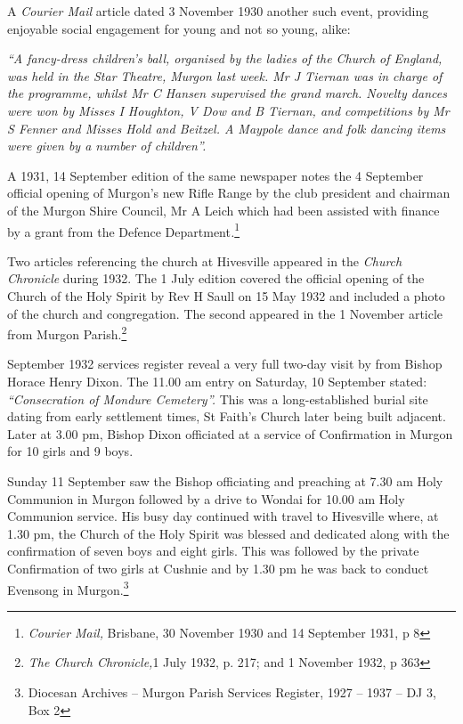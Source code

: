 A \emph{Courier Mail} article dated 3 November 1930 another such event, providing enjoyable social engagement for young and not so young, alike:



\emph{``A fancy-dress children's ball, organised by the ladies of the Church of England, was held in the Star Theatre, Murgon last week. Mr J Tiernan was in charge of the programme, whilst Mr C Hansen supervised the grand march. Novelty dances were won by Misses I Houghton, V Dow and B Tiernan, and competitions by Mr S Fenner and Misses Hold and Beitzel. A Maypole dance and folk dancing items were given by a number of children''.}



A 1931, 14 September edition of the same newspaper notes the 4 September official opening of Murgon's new Rifle Range by the club president and chairman of the Murgon Shire Council, Mr A Leich which had been assisted with finance by a grant from the Defence Department\emph{.}\footnote{\emph{Courier Mail,} Brisbane, 30 November 1930 and 14 September 1931, p 8}


Two articles referencing the church at Hivesville appeared in the \emph{Church Chronicle} during 1932. The 1 July edition covered the official opening of the Church of the Holy Spirit by Rev H Saull on 15 May 1932 and included a photo of the church and congregation. The second appeared in the 1 November article from Murgon Parish.\footnote{\emph{The Church Chronicle,}1 July 1932, p. 217; and 1 November 1932, p 363}


September 1932 services register reveal a very full two-day visit by from Bishop Horace Henry Dixon. The 11.00 am entry on Saturday, 10 September stated: \emph{``Consecration of Mondure Cemetery''.} This was a long-established burial site dating from early settlement times, St Faith's Church later being built adjacent. Later at 3.00 pm, Bishop Dixon officiated at a service of Confirmation in Murgon for 10 girls and 9 boys.



Sunday 11 September saw the Bishop officiating and preaching at 7.30 am Holy Communion in Murgon followed by a drive to Wondai for 10.00 am Holy Communion service. His busy day continued with travel to Hivesville where, at 1.30 pm, the Church of the Holy Spirit was blessed and dedicated along with the confirmation of seven boys and eight girls. This was followed by the private Confirmation of two girls at Cushnie and by 1.30 pm he was back to conduct Evensong in Murgon.\footnote{Diocesan Archives -- Murgon Parish Services Register, 1927 -- 1937 -- DJ 3, Box 2}


